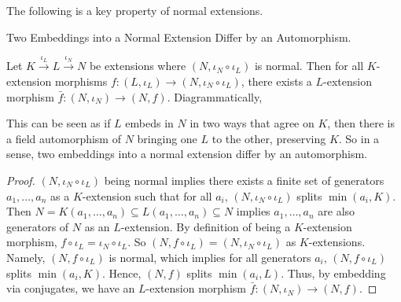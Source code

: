 \documentclass[../book.tex]{subfiles}
\begin{document}
\begin{rmk}
    The following is a key property of normal extensions.
\end{rmk}
\begin{thm} Two Embeddings into a Normal Extension Differ by an Automorphism.
    
    Let $K \overset{\iota_L}{\to} L \overset{\iota_N}{\to} N$ be extensions
    where $(N,\iota_N\circ\iota_L)$ is normal. 
    Then for all $K$-extension morphisms 
    $f : (L,\iota_L) \to (N,\iota_N\circ\iota_L)$,
    there exists a $L$-extension morphism $\bar{f} : (N,\iota_N) \to (N,f)$.
    Diagrammatically, 
    \begin{figure}[H]
        \centering
    \end{figure}
    This can be seen as if $L$ embeds in $N$ in two ways that agree on $K$, 
    then there is a field automorphism of $N$ bringing one $L$ to the other, 
    preserving $K$. 
    So in a sense, two embeddings into a normal extension
    differ by an automorphism. 
\end{thm}
\begin{proof}
    $(N,\iota_N\circ\iota_L)$ being normal implies
    there exists a finite set of generators $a_1,\dots,a_n$ as a $K$-extension
    such that for all $a_i$, $(N,\iota_N\circ\iota_L)$ splits $\min(a_i,K)$. 
    Then $N = K(a_1,\dots,a_n) \subseteq L(a_1,\dots,a_n) \subseteq N$
    implies $a_1,\dots,a_n$ are also generators of $N$ as an $L$-extension.
    By definition of being a $K$-extension morphism, 
    $f\circ\iota_L = \iota_N\circ\iota_L$. 
    So $(N,f\circ\iota_L) = (N,\iota_N\circ\iota_L)$ as $K$-extensions. 
    Namely, $(N,f\circ\iota_L)$ is normal, which implies 
    for all generators $a_i$, $(N,f\circ\iota_L)$ splits $\min(a_i,K)$.
    Hence, $(N,f)$ splits $\min(a_i,L)$.
    Thus, by embedding via conjugates, we have an $L$-extension morphism
    $\bar{f} : (N,\iota_N) \to (N,f)$. 
\end{proof}

    
\end{document}
